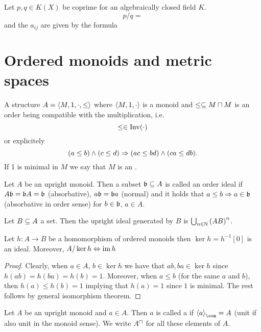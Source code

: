\documentclass[8pt,a4paper]{article}
\begin{document}
\begin{lemma}
    Let $p,q\in K(X)$ be coprime for an algebraically closed field $K$.
    $$
    p/q=
    $$
    and the $a_{ij}$ are given by the formula
\end{lemma}

\section{Ordered monoids and metric spaces}

\begin{definition}
    A structure $A=\struct{M,1,\cdot,\leq}$ where $\struct{M,1,\cdot}$ is a monoid and $\leq\setleq M\settimes M$ is an order being compatible with the multiplication, i.e.
    $$
    \leq \in \mathop\mathrm{Inv}(\cdot)
    $$
    or explicitely
    $$
    (a\leq b) \wedge (c\leq d) \Rightarrow (ac\leq bd)\wedge (ca\leq db).
    $$
    If 1 is minimal in $M$ we say that $M$ is an .
\end{definition}

\begin{definition}
    Let $A$ be an upright monoid. Then a subset $\mathfrak{b}\subseteq A$ is called an order ideal if $A\mathfrak{b}=\mathfrak{b} A=\mathfrak{b}$ (absorbative), $a\mathfrak{b}=\mathfrak{b} a$ (normal) and it holds that $a\leq b \Rightarrow a\in \mathfrak{b}$ (absorbative in order sense) for $b\in \mathfrak{b}$, $a\in A$.
\end{definition}

\begin{lemma}
    Let $B\subseteq A$ a set. Then the upright ideal generated by $B$ is $\bigcup_{n\in\mathbb{N}}{{(AB)}^n}$.
\end{lemma}

\begin{lemma}
    Let $h:A\to B$ be a homomorphism of ordered monoids then
    $\ker{h}=h^{-1}[0]$ is an ideal. Moreover, $A/\ker{h}\Leftrightarrow \mathop\mathrm{im}{h}$
\end{lemma}

\begin{proof}
    Clearly, when $a\in A$, $b\in\ker{h}$ we have that $ab,ba\in\ker{h}$ since $h(ab)=h(ba)=h(b)=1$. Moreover, when $a\leq b$ (for the same $a$ and $b$), then $h(a)\leq h(b)=1$ implying that $h(a)=1$ since $1$ is minimal. The rest follows by general isomorphism theorem.
\end{proof}

\begin{definition}
    Let $A$ be an upright monoid and $a\in A$. Then $a$ is called a  if $\gen[\con]{a}=A$ (unit if also unit in the monoid sense). We write $\units{A}$ for all these elements of $A$.
\end{definition}
\end{document}
